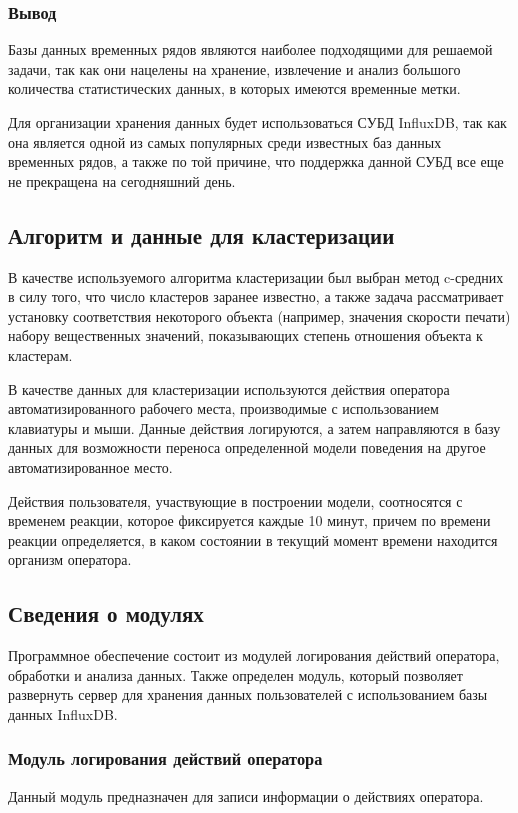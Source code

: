 \subsubsection*{Вывод}
Базы данных временных рядов являются наиболее подходящими для решаемой задачи, так как они нацелены на хранение, извлечение и анализ большого количества статистических данных, в которых имеются временные метки.

Для организации хранения данных будет использоваться СУБД InfluxDB, так как она является одной из самых популярных среди известных баз данных временных рядов, а также по той причине, что поддержка данной СУБД все еще не прекращена на сегодняшний день.

\subsection{Алгоритм и данные для кластеризации}
В качестве используемого алгоритма кластеризации был выбран метод c-средних в силу того, что число кластеров заранее известно, а также задача рассматривает установку соответствия некоторого объекта (например, значения скорости печати) набору вещественных значений, показывающих степень отношения объекта к кластерам.

В качестве данных для кластеризации используются действия оператора автоматизированного рабочего места, производимые с использованием клавиатуры и мыши. Данные действия логируются, а затем направляются в базу данных для возможности переноса определенной модели поведения на другое автоматизированное место.

Действия пользователя, участвующие в построении модели, соотносятся с временем реакции, которое фиксируется каждые 10 минут, причем по времени реакции определяется, в каком состоянии в текущий момент времени находится организм оператора.

\subsection{Сведения о модулях}
Программное обеспечение состоит из модулей логирования действий \newline оператора, обработки и анализа данных. Также определен модуль, который позволяет развернуть сервер для хранения данных пользователей с использованием базы данных InfluxDB.

\subsubsection{Модуль логирования действий оператора}
Данный модуль предназначен для записи информации о действиях оператора.

